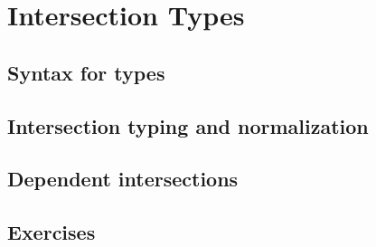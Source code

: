 \chapter{Intersection Types}

\section{Syntax for types}
\label{sec:synint}

\section{Intersection typing and normalization}
\label{sec:depint}


\section{Dependent intersections}
\label{sec:depint}


\section{Exercises}

